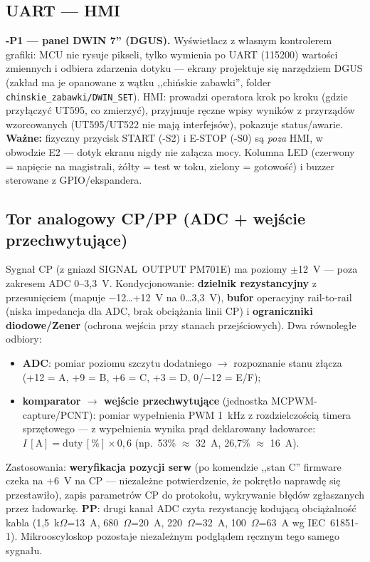 \documentclass[11pt,a4paper]{article}
\newcommand{\ohm}{$\Omega$}
\begin{document}
\subsection{UART --- HMI}
\textbf{-P1 --- panel DWIN 7'' (DGUS).} Wyświetlacz z własnym kontrolerem grafiki: MCU nie rysuje
pikseli, tylko wymienia po UART (115200) wartości zmiennych i odbiera zdarzenia dotyku ---
ekrany projektuje się narzędziem DGUS (zakład ma je opanowane z wątku ,,chińskie zabawki'',
folder \texttt{chinskie\_zabawki/DWIN\_SET}). HMI: prowadzi operatora krok po kroku (gdzie
przyłączyć UT595, co zmierzyć), przyjmuje ręczne wpisy wyników z przyrządów wzorcowanych
(UT595/UT522 nie mają interfejsów), pokazuje status/awarie. \textbf{Ważne:} fizyczny przycisk
START (-S2) i E-STOP (-S0) są \emph{poza} HMI, w obwodzie E2 --- dotyk ekranu nigdy nie załącza
mocy. Kolumna LED (czerwony = napięcie na magistrali, żółty = test w toku, zielony = gotowość)
i buzzer sterowane z GPIO/ekspandera.

\subsection{Tor analogowy CP/PP (ADC + wejście przechwytujące)}
\label{sec:cp}
Sygnał CP (z gniazd SIGNAL~OUTPUT PM701E) ma poziomy $\pm$12~V --- poza zakresem ADC 0--3,3~V.
Kondycjonowanie: \textbf{dzielnik rezystancyjny} z przesunięciem (mapuje $-$12\ldots+12~V na
0\ldots3,3~V), \textbf{bufor} operacyjny rail-to-rail (niska impedancja dla ADC, brak obciążania
linii CP) i \textbf{ograniczniki diodowe/Zener} (ochrona wejścia przy stanach przejściowych).
Dwa równoległe odbiory:
\begin{itemize}
\item \textbf{ADC}: pomiar poziomu szczytu dodatniego $\to$ rozpoznanie stanu złącza
(+12 = A, +9 = B, +6 = C, +3 = D, 0/$-$12 = E/F);
\item \textbf{komparator $\to$ wejście przechwytujące} (jednostka MCPWM-capture/PCNT):
pomiar wypełnienia PWM 1~kHz z rozdzielczością timera sprzętowego --- z wypełnienia wynika prąd
deklarowany ładowarce: $I\,[\mathrm{A}] = \text{duty}\,[\%]\times 0{,}6$ (np.\ 53\% $\approx$ 32~A,
26,7\% $\approx$ 16~A).
\end{itemize}
Zastosowania: \textbf{weryfikacja pozycji serw} (po komendzie ,,stan C'' firmware czeka na
+6~V na CP --- niezależne potwierdzenie, że pokrętło naprawdę się przestawiło), zapis parametrów
CP do protokołu, wykrywanie błędów zgłaszanych przez ładowarkę. \textbf{PP}: drugi kanał ADC
czyta rezystancję kodującą obciążalność kabla (1,5~k\ohm{}=13~A, 680~\ohm{}=20~A,
220~\ohm{}=32~A, 100~\ohm{}=63~A wg IEC~61851-1). Mikrooscyloskop pozostaje niezależnym
podglądem ręcznym tego samego sygnału.
\end{document}
